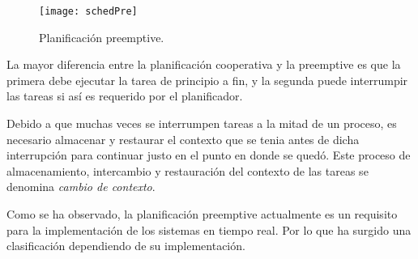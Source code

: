   \begin{figure}[h!]
      \centering
        \texttt{[image: schedPre]}
        \caption{Planificación preemptive.\cite{medium}}
        \label{fig:schedpree}
    \end{figure}

La mayor diferencia entre la planificación cooperativa y la preemptive es que la primera debe ejecutar la tarea de principio a fin, y la segunda puede interrumpir las tareas si así es requerido por el planificador.
\newline

Debido a que muchas veces se interrumpen tareas a la mitad de un proceso, es necesario almacenar y restaurar el contexto que se tenia antes de dicha interrupción para continuar justo en el punto en donde se quedó. Este proceso de almacenamiento, intercambio y restauración del contexto de las tareas se denomina \textit{cambio de contexto}.
\newline

Como se ha observado, la planificación preemptive actualmente es un requisito para la implementación de los sistemas en tiempo real. Por lo que ha surgido una clasificación dependiendo de su implementación\cite{Buttazzo2013}.

